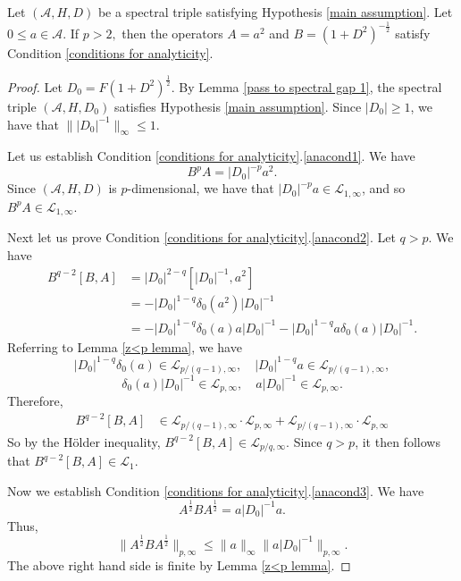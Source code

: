     \begin{lem}\label{verification p>2} 
        Let $(\mathcal{A},H,D)$ be a spectral triple satisfying Hypothesis \ref{main assumption}. 
        Let $0\leq a\in\mathcal{A}.$ If $p>2,$ then the operators $A=a^2$ and $B=(1+D^2)^{-\frac12}$ satisfy Condition \ref{conditions for analyticity}.
    \end{lem}
    \begin{proof} 
        Let $D_0=F(1+D^2)^{\frac12}.$ By Lemma \ref{pass to spectral gap 1}, the spectral triple $(\mathcal{A},H,D_0)$ satisfies Hypothesis \ref{main assumption}. 
        Since $|D_0| \geq 1$, we have that $\||D_0|^{-1}\|_\infty \leq 1$.

        Let us establish Condition \ref{conditions for analyticity}.\eqref{anacond1}. 
        We have
        $$B^pA=|D_0|^{-p}a^2.$$
        Since $(\mathcal{A},H,D)$ is $p$-dimensional, we have that $|D_0|^{-p}a \in \mathcal{L}_{1,\infty}$, and so $B^pA \in \mathcal{L}_{1,\infty}$.

        Next let us prove Condition \ref{conditions for analyticity}.\eqref{anacond2}. Let $q>p.$ We have
        \begin{align*}
            B^{q-2}[B,A] &= |D_0|^{2-q}[|D_0|^{-1},a^2]\\
                         &= -|D_0|^{1-q}\delta_0(a^2)|D_0|^{-1}\\
                         &= -|D_0|^{1-q}\delta_0(a)a|D_0|^{-1}-|D_0|^{1-q}a\delta_0(a)|D_0|^{-1}.
        \end{align*}
        Referring to Lemma \ref{z<p lemma}, we have
        $$|D_0|^{1-q}\delta_0(a) \in \mathcal{L}_{p/(q-1),\infty},\quad |D_0|^{1-q}a \in \mathcal{L}_{p/(q-1),\infty},$$
        $$\delta_0(a)|D_0|^{-1} \in \mathcal{L}_{p,\infty},\quad a|D_0|^{-1} \in \mathcal{L}_{p,\infty}.$$
        Therefore,
        \begin{align*}
            B^{q-2}[B,A] &\in \mathcal{L}_{p/(q-1),\infty}\cdot \mathcal{L}_{p,\infty} + \mathcal{L}_{p/(q-1),\infty}\cdot \mathcal{L}_{p,\infty}
        \end{align*}
        So by the H\"older inequality, $B^{q-2}[B,A] \in \mathcal{L}_{p/q,\infty}$. Since $q > p$, it then follows that $B^{q-2}[B,A] \in \mathcal{L}_1$.
        
        Now we establish Condition \ref{conditions for analyticity}.\eqref{anacond3}. We have
        $$A^{\frac12}BA^{\frac12}=a|D_0|^{-1}a.$$
        Thus,
        $$\|A^{\frac12}BA^{\frac12}\|_{p,\infty}\leq\|a\|_{\infty}\|a|D_0|^{-1}\|_{p,\infty}.$$
        The above right hand side is finite by Lemma \ref{z<p lemma}.


\end{proof}
